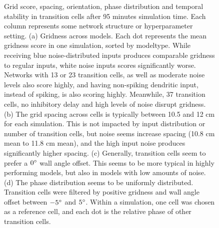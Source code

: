 \documentclass{article}
\begin{document}
\begin{figure}[htbp]
        \caption{Grid score, spacing, orientation, phase distribution and temporal stability in transition cells after 95 minutes simulation time. Each column represents some network structure or hyperparameter setting. (a) Gridness across models. Each dot represents the mean gridness score in one simulation, sorted by modeltype. While receiving blue noise-distributed inputs produces comparable gridness to regular inputs, white noise inputs scores significantly worse. Networks with 13 or 23 transition cells, as well as moderate noise levels also score highly, and having non-spiking dendritic input, instead of spiking, is also scoring highly. Meanwhile, 37 transition cells, no inhibitory delay and high levels of noise disrupt gridness. (b) The grid spacing across cells is typically between 10.5 and 12 cm for each simulation. This is not impacted by input distribution or number of transition cells, but noise seems increase spacing (10.8 cm mean to 11.8 cm mean), and the high input noise produces significantly higher spacing. (c) Generally, transition cells seem to prefer a \(0\degree\) wall angle offset. This seems to be more typical in highly performing models, but also in models with low amounts of noise. (d) The phase distribution seems to be uniformly distributed. Transition cells were filtered by positive gridness and wall angle offset between \(-5\degree\) and \(5\degree\). Within a simulation, one cell was chosen as a reference cell, and each dot is the relative phase of other transition cells.}
        
        \label{model_comparison}

    \end{figure}

    \printbibliography
\end{document}
